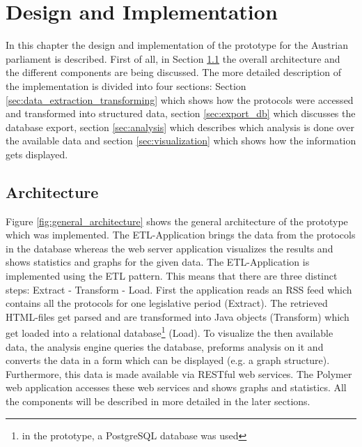 \chapter{Design and Implementation}
\label{chap:implementation}

In this chapter the design and implementation of the prototype for the Austrian parliament is described. First of all, in Section \ref{sec:architecture} the overall architecture and the different components are being discussed. The more detailed description of the implementation is divided into four sections: Section \ref{sec:data_extraction_transforming} which shows how the protocols were accessed and transformed into structured data, section \ref{sec:export_db} which discusses the database export, section \ref{sec:analysis} which describes which analysis is done over the available data and section \ref{sec:visualization} which shows how the information gets displayed.

\section{Architecture}
\label{sec:architecture}
Figure \ref{fig:general_architecture} shows the general architecture of the prototype which was implemented. The ETL-Application brings the data from the protocols in the database whereas the web server application visualizes the results and shows statistics and graphs for the given data. The ETL-Application is implemented using the ETL pattern. This means that there are three distinct steps: Extract - Transform - Load. First the application reads an RSS feed which contains all the protocols for one legislative period (Extract). The retrieved HTML-files get parsed and are transformed into Java objects (Transform) which get loaded into a relational database\footnote{in the prototype, a PostgreSQL database was used} (Load). To visualize the then available data, the analysis engine queries the database, preforms analysis on it and converts the data in a form which can be displayed (e.g. a graph structure). Furthermore, this data is made available via RESTful web services. The Polymer web application accesses these web services and shows graphs and statistics. All the components will be described in more detailed in the later sections.

